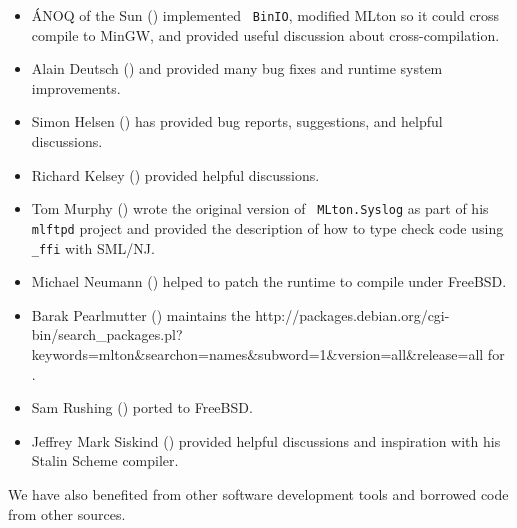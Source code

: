 \begin{itemize}

\item
\'{A}NOQ of the Sun () implemented {\tt
BinIO}, modified MLton so it could cross compile to MinGW, and provided useful
discussion about cross-compilation.

\item
Alain Deutsch () and  provided many bug fixes and
runtime system improvements.

\item
Simon Helsen () has provided bug reports, suggestions,
and helpful discussions.

\item
Richard Kelsey () provided helpful
discussions.

\item
Tom Murphy () wrote the original version of {\tt
MLton.Syslog} as part of his {\tt mlftpd} project and provided the description
of how to type check code using {\tt \_ffi} with SML/NJ.

\item
Michael Neumann () helped to patch the runtime
to compile under FreeBSD.

\item
Barak Pearlmutter () maintains the
		  {http://packages.debian.org/cgi-bin/search_packages.pl?keywords=mlton&searchon=names&subword=1&version=all&release=all}
for {\mlton}.

\item
Sam Rushing () ported {\mlton} to FreeBSD.

\item
Jeffrey Mark Siskind () provided helpful discussions
and inspiration with his Stalin Scheme compiler.

\end{itemize}

We have also benefited from other software development tools and borrowed code
from other sources.

